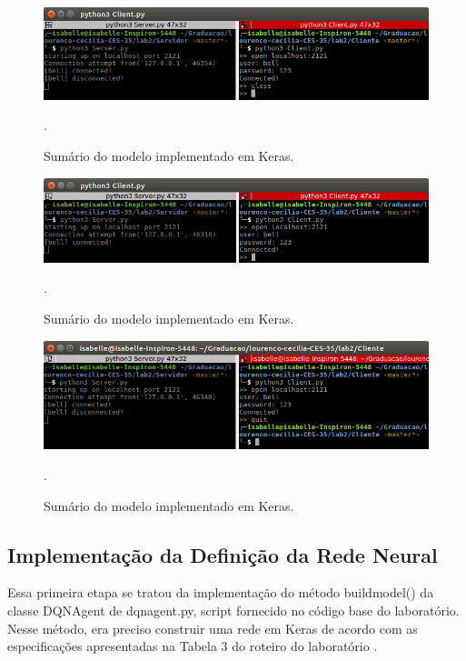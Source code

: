 \documentclass[conference]{IEEEtran}
\begin{document}
\begin{figure}[htbp]
\centering
\centerline{\includegraphics[scale=0.3]{prints/close.png}}
\caption{Sumário do modelo implementado em Keras.}.
\label{summary}
\end{figure}

\begin{figure}[htbp]
\centering
\centerline{\includegraphics[scale=0.3]{prints/open1.png}}
\caption{Sumário do modelo implementado em Keras.}.
\label{summary}
\end{figure}

\begin{figure}[htbp]
\centering
\centerline{\includegraphics[scale=0.3]{prints/quit1.png}}
\caption{Sumário do modelo implementado em Keras.}.
\label{summary}
\end{figure}

	\subsection{Implementação da Definição da Rede Neural}
	
	Essa primeira etapa se tratou da implementação do método build\underline{\space}model() da classe DQNAgent de dqn\underline{\space}agent.py, script fornecido no código base do laboratório. Nesse método, era preciso construir uma rede em Keras de acordo com as especificações apresentadas na Tabela 3 do roteiro do laboratório \cite{roteiro}.
	
\end{document}
